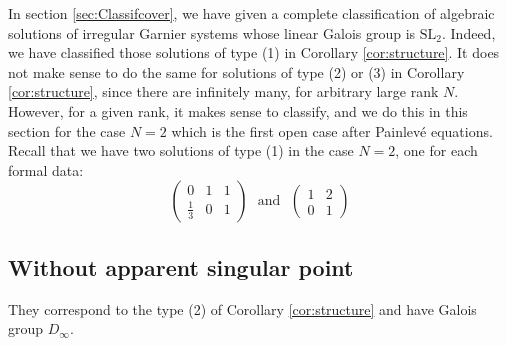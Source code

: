 \documentclass[12]{amsart}
\newcommand{\SL}{\mathrm{SL}_2}
\begin{document}
In section \ref{sec:Classifcover}, we have given a complete classification of algebraic
solutions of irregular Garnier systems whose linear Galois group is $\SL$. Indeed,
we have classified those solutions of type (1) in Corollary \ref{cor:structure}.
It does not make sense to do the same for solutions of type (2) or (3) in Corollary \ref{cor:structure},
since there are infinitely many, for arbitrary large rank $N$. However, for a given rank,
it makes sense to classify, and we do this in this section for the case $N=2$
which is the first open case after Painlev\'e equations. Recall that we have two solutions 
of type (1) in the case $N=2$, one for each formal data:
$$\begin{pmatrix}0&1&1\\ \frac{1}{3}&0&1\end{pmatrix}\ \ \ 
\text{and}\ \ \ \begin{pmatrix}1&2\\ 0&1\end{pmatrix}$$




\subsection{Without apparent singular point}\label{sec:ClassifDihedral5}
They correspond to the type (2) of Corollary \ref{cor:structure} and have Galois group $D_\infty$.
\end{document}
